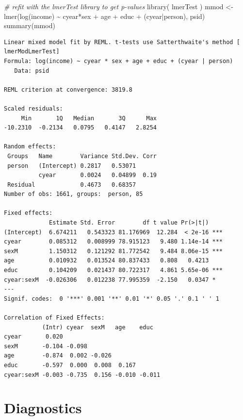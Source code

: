 \documentclass[
  letterpaper,
  DIV=11,
  numbers=noendperiod]{scrreprt}
\newenvironment{Shaded}{\begin{snugshade}}{\end{snugshade}}
\newcommand{\CommentTok}[1]{\textcolor[rgb]{0.38,0.63,0.69}{\textit{#1}}}
\newcommand{\FunctionTok}[1]{\textcolor[rgb]{0.02,0.16,0.49}{#1}}
\newcommand{\NormalTok}[1]{\textcolor[rgb]{0.00,0.44,0.13}{#1}}
\newcommand{\OtherTok}[1]{\textcolor[rgb]{0.00,0.44,0.13}{#1}}
\newcommand{\SpecialCharTok}[1]{\textcolor[rgb]{0.25,0.44,0.63}{#1}}
\begin{document}
\begin{Shaded}
\begin{Highlighting}[]
\CommentTok{\# refit with the lmerTest library to get p{-}values}
\FunctionTok{library}\NormalTok{( lmerTest )}
\NormalTok{mmod }\OtherTok{\textless{}{-}} \FunctionTok{lmer}\NormalTok{(}\FunctionTok{log}\NormalTok{(income) }\SpecialCharTok{\textasciitilde{}}\NormalTok{ cyear}\SpecialCharTok{*}\NormalTok{sex }\SpecialCharTok{+}\NormalTok{ age }\SpecialCharTok{+}\NormalTok{ educ }\SpecialCharTok{+}\NormalTok{ (cyear}\SpecialCharTok{|}\NormalTok{person), psid)}
\FunctionTok{summary}\NormalTok{(mmod)}
\end{Highlighting}
\end{Shaded}

\begin{verbatim}
Linear mixed model fit by REML. t-tests use Satterthwaite's method [
lmerModLmerTest]
Formula: log(income) ~ cyear * sex + age + educ + (cyear | person)
   Data: psid

REML criterion at convergence: 3819.8

Scaled residuals: 
     Min       1Q   Median       3Q      Max 
-10.2310  -0.2134   0.0795   0.4147   2.8254 

Random effects:
 Groups   Name        Variance Std.Dev. Corr
 person   (Intercept) 0.2817   0.53071      
          cyear       0.0024   0.04899  0.19
 Residual             0.4673   0.68357      
Number of obs: 1661, groups:  person, 85

Fixed effects:
             Estimate Std. Error        df t value Pr(>|t|)    
(Intercept)  6.674211   0.543323 81.176969  12.284  < 2e-16 ***
cyear        0.085312   0.008999 78.915123   9.480 1.14e-14 ***
sexM         1.150312   0.121292 81.772542   9.484 8.06e-15 ***
age          0.010932   0.013524 80.837433   0.808   0.4213    
educ         0.104209   0.021437 80.722317   4.861 5.65e-06 ***
cyear:sexM  -0.026306   0.012238 77.995359  -2.150   0.0347 *  
---
Signif. codes:  0 '***' 0.001 '**' 0.01 '*' 0.05 '.' 0.1 ' ' 1

Correlation of Fixed Effects:
           (Intr) cyear  sexM   age    educ  
cyear       0.020                            
sexM       -0.104 -0.098                     
age        -0.874  0.002 -0.026              
educ       -0.597  0.000  0.008  0.167       
cyear:sexM -0.003 -0.735  0.156 -0.010 -0.011
\end{verbatim}

\hypertarget{diagnostics}{%
\section{Diagnostics}\label{diagnostics}}
\end{document}
